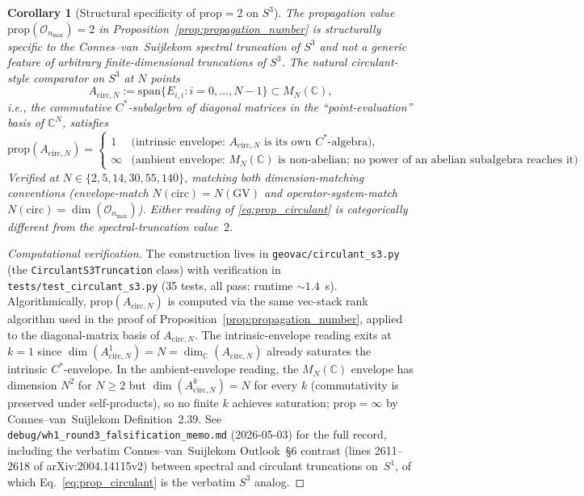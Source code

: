\documentclass[11pt]{article}
\newtheorem{corollary}{Corollary}
\begin{document}
\begin{corollary}[Structural specificity of $\mathrm{prop} = 2$ on $S^3$]
\label{cor:structural_specificity}
The propagation value
$\mathrm{prop}(\mathcal{O}_{n_{\max}}) = 2$ in
Proposition~\ref{prop:propagation_number} is structurally specific to
the Connes--van~Suijlekom spectral truncation of $S^3$ and \emph{not}
a generic feature of arbitrary finite-dimensional truncations of $S^3$.
The natural circulant-style comparator on $S^3$ at $N$ points
\[
   A_{\mathrm{circ}, N} := \mathrm{span}\{E_{i, i} : i = 0, \ldots, N - 1\}
   \subset M_N(\mathbb{C}),
\]
i.e., the commutative $C^*$-subalgebra of diagonal matrices in the
``point-evaluation'' basis of $\mathbb{C}^N$, satisfies
\begin{equation}
   \mathrm{prop}(A_{\mathrm{circ}, N}) = \begin{cases}
      1 & \text{(intrinsic envelope:\ $A_{\mathrm{circ}, N}$ is its own
                  $C^*$-algebra)}, \\
      \infty & \text{(ambient envelope:\ $M_N(\mathbb{C})$ is non-abelian;
                       no power of an abelian subalgebra reaches it)}.
   \end{cases}
   \label{eq:prop_circulant}
\end{equation}
Verified at $N \in \{2, 5, 14, 30, 55, 140\}$, matching both
dimension-matching conventions (envelope-match $N(\mathrm{circ}) =
N(\mathrm{GV})$ and operator-system-match $N(\mathrm{circ}) =
\dim(\mathcal{O}_{n_{\max}})$).  Either reading of
\eqref{eq:prop_circulant} is categorically different from the
spectral-truncation value~$2$.
\end{corollary}

\begin{proof}[Computational verification]
The construction lives in \texttt{geovac/circulant\_s3.py} (the
\texttt{CirculantS3Truncation} class) with verification in
\texttt{tests/test\_circulant\_s3.py} (35 tests, all pass; runtime
${\sim}1.4$~s).  Algorithmically, $\mathrm{prop}(A_{\mathrm{circ}, N})$
is computed via the same vec-stack rank algorithm used in the
proof of Proposition~\ref{prop:propagation_number}, applied to the
diagonal-matrix basis of $A_{\mathrm{circ}, N}$.  The intrinsic-envelope
reading exits at $k = 1$ since $\dim(A_{\mathrm{circ}, N}^1) = N =
\dim_{\mathbb{C}}(A_{\mathrm{circ}, N})$ already saturates the
intrinsic $C^*$-envelope.  In the ambient-envelope reading, the
$M_N(\mathbb{C})$ envelope has dimension $N^2$ for $N \ge 2$ but
$\dim(A_{\mathrm{circ}, N}^k) = N$ for every $k$ (commutativity is
preserved under self-products), so no finite $k$ achieves
saturation; $\mathrm{prop} = \infty$ by Connes--van~Suijlekom
Definition~2.39.  See
\texttt{debug/wh1\_round3\_falsification\_memo.md} (2026-05-03) for
the full record, including the verbatim Connes--van~Suijlekom Outlook~\S6
contrast (lines 2611--2618 of arXiv:2004.14115v2) between
spectral and circulant truncations on~$S^1$, of which
Eq.~\eqref{eq:prop_circulant} is the verbatim $S^3$ analog.
\end{proof}
\end{document}
